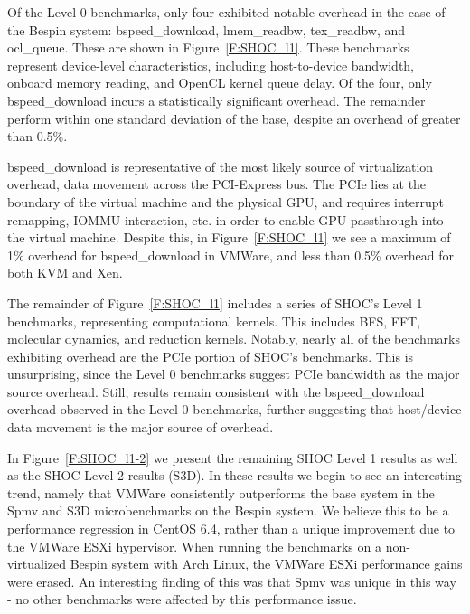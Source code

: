 Of the Level 0 benchmarks, only four exhibited notable
overhead in the case of the Bespin system: bspeed\_download, lmem\_readbw, tex\_readbw, and ocl\_queue.  These are
shown in Figure~\ref{F:SHOC_l1}.  These benchmarks represent device-level
characteristics, including host-to-device bandwidth, onboard memory reading, and OpenCL
kernel queue delay.  Of the four, only bspeed\_download incurs a statistically
significant overhead.  The remainder perform within one standard deviation of
the base, despite an overhead of greater than 0.5\%.  

bspeed\_download is representative of the most likely source of virtualization overhead, data
movement across the PCI-Express bus.  The PCIe lies at the boundary of
the virtual machine and the physical GPU, and requires interrupt remapping,
IOMMU interaction, etc. in order to enable GPU passthrough into the virtual
machine.  Despite this, in Figure~\ref{F:SHOC_l1} we see a maximum of 1\% overhead
for bspeed\_download in
VMWare, and less than 0.5\% overhead for both KVM and Xen.

The remainder of Figure~\ref{F:SHOC_l1} includes a series of SHOC's Level 1
benchmarks, representing computational kernels.  This includes BFS, FFT, molecular dynamics,
and reduction kernels.  Notably, nearly all of the benchmarks exhibiting
overhead are the PCIe portion of SHOC's benchmarks. This is unsurprising, since
the Level 0 benchmarks suggest PCIe bandwidth as the major source overhead.
Still, results remain consistent with the bspeed\_download overhead observed in
the Level 0 benchmarks, further suggesting that host/device data movement
is the major source of overhead.

In Figure~\ref{F:SHOC_l1-2} we present the remaining SHOC Level 1 results as well
as the SHOC Level 2 results (S3D).  In these results we begin to see an interesting trend,
namely that VMWare consistently outperforms the base system in the Spmv and S3D
microbenchmarks on the Bespin system.  We believe this to be a performance
regression in CentOS 6.4, rather than a unique improvement due to the VMWare ESXi
hypervisor.  When running the benchmarks on a non-virtualized Bespin system with
Arch Linux, the VMWare ESXi performance gains were erased.  An interesting
finding of this was that Spmv was unique in this way - no other benchmarks were
affected by this performance issue.



